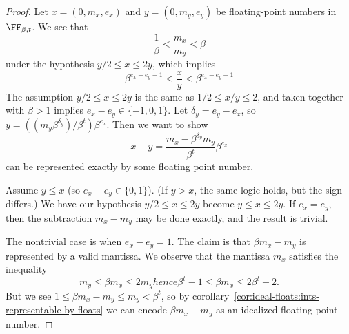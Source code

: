 \begin{proof}
  Let $x = (0, m_{x}, e_{x})$ and $y=(0,m_{y},e_{y})$ be floating-point
  numbers in $\FF_{\beta,t}$. We see that
  \begin{equation}
   \frac{1}{\beta} < \frac{m_{x}}{m_{y}} < \beta
  \end{equation}
  under the hypothesis $y/2\leq x\leq 2y$, which implies
  \begin{equation}
    \beta^{e_{x}-e_{y}-1} < \frac{x}{y} < \beta^{e_{x}-e_{y}+1}
  \end{equation}
  The assumption $y/2\leq x\leq 2y$ is the same as $1/2\leq x/y\leq 2$,
  and taken together with $\beta>1$
  implies $e_{x}-e_{y}\in\{-1,0,1\}$. Let $\delta_{y}=e_{y}-e_{x}$, so
  $y = ((m_{y}\beta^{\delta_{y}})/\beta^{t})\beta^{e_{x}}$. Then we want
  to show
  \begin{equation}
    x-y = \frac{m_{x} - \beta^{\delta_{y}}m_{y}}{\beta^{t}}\beta^{e_{x}}
  \end{equation}
  can be represented exactly by some floating point number.

  Assume $y\leq x$ (so $e_{x}-e_{y}\in\{0,1\}$). (If $y > x$, the same
  logic holds, but the sign differs.) We have our hypothesis
  $y/2\leq x\leq 2y$ become $y\leq x\leq 2y$. If $e_{x}=e_{y}$, then the
  subtraction $m_{x}-m_{y}$ may be done exactly, and the result is
  trivial.

  The nontrivial case is when $e_{x}-e_{y}=1$. The claim is that
  $\beta m_{x}-m_{y}$ is represented by a valid mantissa. We observe
  that the mantissa $m_{x}$ satisfies the inequality
  \begin{subequations}
  \begin{equation}
    m_{y} \leq \beta m_{x} \leq 2m_{y}
  \end{equation}
  hence
  \begin{equation}\label{eq:sternbez-lemma:bounds-on-x-mantissa}
    \beta^{t}-1\leq \beta m_{x}\leq 2\beta^{t}-2.
  \end{equation}
  \end{subequations}
  But we see $1\leq \beta m_{x}-m_{y}\leq m_{y} < \beta^{t}$, so
  by corollary~\ref{cor:ideal-floats:ints-representable-by-floats}
  we can encode $\beta m_{x}-m_{y}$ as an idealized floating-point number.
\end{proof}

